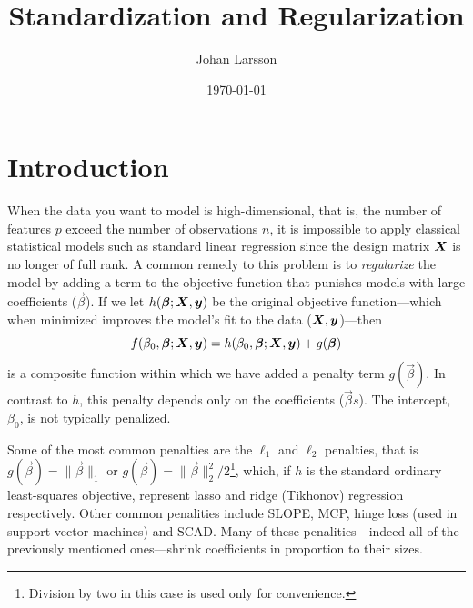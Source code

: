 


\title{Standardization and Regularization}
\author[1,*]{Johan Larsson}
\date{\today}

\usepackage[style=alphabetic]{biblatex}




\maketitle

\section{Introduction}

When the data you want to model is high-dimensional, that is, the number of features \(p\) exceed the number of observations \(n\), it is impossible to apply classical statistical models such as standard linear regression since the design matrix \(\mat X\) is no longer of full rank. A common remedy to this problem is to \emph{regularize} the model by adding a term to the objective function that punishes models with large coefficients (\(\vec\beta\)). If we let \(h(\vec\beta; \mat X, \vec y)\) be the original objective function---which when minimized improves the model's fit to the data (\(\mat X, \vec y\))---then
\[
  f(\beta_0, \vec\beta; \mat X, \vec y) = h(\beta_0, \vec\beta; \mat X, \vec y) + g(\vec\beta)
\]
is a composite function within which we have added a penalty term \(g(\vec\beta)\).
In contrast to \(h\), this penalty depends only on the coefficients (\(\vec{\beta}s\)).
The intercept, \(\beta_0\), is not typically penalized.

Some of the most common penalties are the \(\ell_1\) and \(\ell_2\) penalties, that is \(g(\vec\beta) = \lVert \vec\beta \rVert_1\) or \(g(\vec\beta) = \lVert \vec\beta \rVert_2^2/2\)\footnote{Division by two in this case is used only for convenience.}, which, if \(h\) is the standard ordinary least-squares objective, represent lasso and ridge (Tikhonov) regression respectively.
Other common penalities include SLOPE, MCP, hinge loss (used in support vector machines) and SCAD.
Many of these penalities---indeed all of the previously mentioned ones---shrink coefficients in proportion to their sizes.

